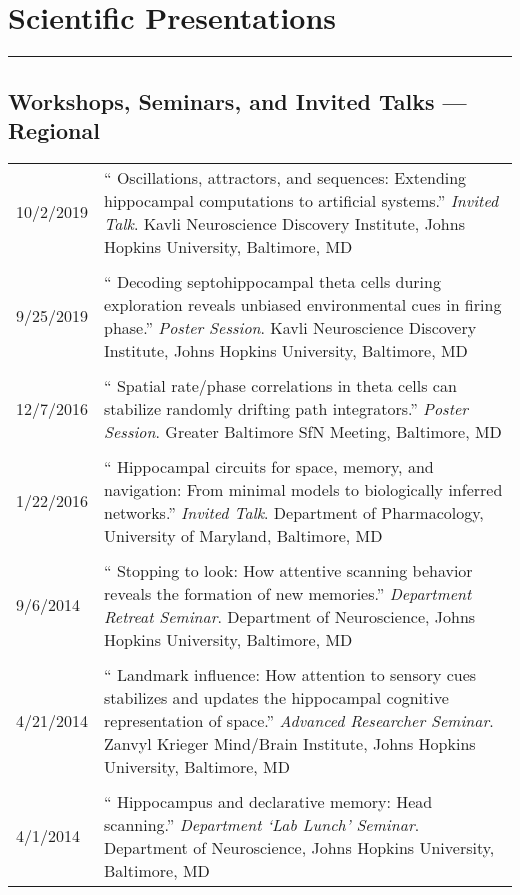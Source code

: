 \documentclass[10pt]{article}
\newcommand{\unpubtitle}[1]{{\color{hopkinsblue} #1}}
\newcommand{\newsection}[2]{%
  \section*{#1}
  \vspace{-.125in}
  \hrule
  \vspace{.22in}
  \label{sec:#2}
}
\begin{document}
\medskip

\newsection{Scientific Presentations}{talks}

\subsection*{Workshops, Seminars, and Invited Talks --- Regional}

\begin{longtable}{@{\hspace{0.2in}}l>{\raggedright\arraybackslash}p{}}
  10/2/2019 \hspace{0.1in} & ``\unpubtitle{Oscillations, attractors, and
  sequences: Extending hippocampal computations to artificial systems}.''
  \emph{Invited Talk}. Kavli Neuroscience Discovery Institute, Johns Hopkins
  University, Baltimore, MD\\
  \tabularnewline
  9/25/2019 & ``\unpubtitle{Decoding septohippocampal theta cells during
  exploration reveals unbiased environmental cues in firing phase}.''
  \emph{Poster Session}. Kavli Neuroscience Discovery Institute, Johns Hopkins
  University, Baltimore, MD\\
  \tabularnewline
  12/7/2016 & ``\unpubtitle{Spatial rate/phase correlations in theta cells
  can stabilize randomly drifting path integrators}.'' \emph{Poster Session}.
  Greater Baltimore SfN Meeting, Baltimore, MD\\
  \tabularnewline
  1/22/2016 & ``\unpubtitle{Hippocampal circuits for space, memory, and
  navigation: From minimal models to biologically inferred networks}.''
  \emph{Invited Talk}. Department of Pharmacology, University of Maryland,
  Baltimore, MD\\
  \tabularnewline
  9/6/2014 & ``\unpubtitle{Stopping to look: How attentive scanning behavior
  reveals the formation of new memories}.'' \emph{Department Retreat Seminar}.
  Department of Neuroscience, Johns Hopkins University, Baltimore, MD\\
  \tabularnewline
  4/21/2014 & ``\unpubtitle{Landmark influence: How attention to sensory cues
  stabilizes and updates the hippocampal cognitive representation of space}.''
  \emph{Advanced Researcher Seminar}. Zanvyl Krieger Mind/Brain Institute, Johns
  Hopkins University, Baltimore, MD\\
  \tabularnewline
  4/1/2014 & ``\unpubtitle{Hippocampus and declarative memory:
  Head scanning}.'' \emph{Department `Lab Lunch' Seminar}. Department of
  Neuroscience, Johns Hopkins University, Baltimore, MD\\
\end{longtable}
\end{document}
